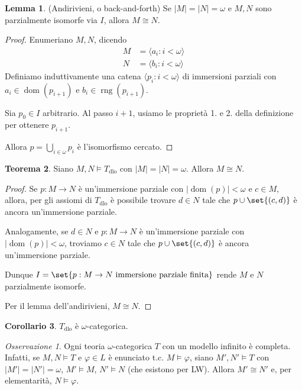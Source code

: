 \documentclass[10pt]{article}
\newcommand{\card}[1]{\left\vert #1 \right\vert}
\newcommand{\1}{\mathds{1}}
\theoremstyle{definition}%
\newtheorem{thm}{Teorema}[section]
\newtheorem{lem}[thm]{Lemma}
\newtheorem{cor}[thm]{Corollario}
\theoremstyle{plain}
\theoremstyle{remark}
\newtheorem*{oss}{Osservazione}
\newcommand{\Tdlo}{T_{\text{dlo}}}
\begin{document}
\begin{lem}
(Andirivieni, o back-and-forth) Se \(\card{M}=\card{N}=\omega\) e \(M,N\) sono parzialmente isomorfe via \(I\), allora \(M\cong N\).
\end{lem}
\begin{proof}
Enumeriano \(M,N\), dicendo
\begin{align*}
M&=\langle a_{i}: i <\omega\rangle\\
N&=\langle b_{i}: i <\omega\rangle
\end{align*}
Definiamo induttivamente una catena \(\langle p_{i}:i<\omega\rangle\) di immersioni parziali con \(a_{i} \in \operatorname{dom}(p_{i+1})\) e \(b_{i} \in \operatorname{rng}(p_{i+1})\).

Sia \(p_{0} \in I\) arbitrario. Al passo \(i+1\), usiamo le proprietà 1. e 2. della definizione per ottenere \(p_{i+1}\).

Allora \(p=\bigcup_{i \in \omega}p_{i}\) è l'isomorfismo cercato.
\end{proof}

\begin{thm}
Siano \(M,N\vDash \Tdlo\) con \(\card{M}=\card{N}=\omega\). Allora \(M\cong N\).
\end{thm}

\begin{proof}
Se \(p:M\to N\) è un'immersione parziale con \(\card{\operatorname{dom}(p)}<\omega\) e \(c \in M\), allora, per gli assiomi di \(\Tdlo\) è possibile trovare \(d \in N\) tale che \(p\cup\set{(c,d)}\) è ancora un'immersione parziale.

Analogamente, se \(d \in N\) e \(p:M\to N\) è un'immersione parziale con \(\card{\operatorname{dom}(p)}<\omega\), troviamo \(c \in N\) tale che \(p\cup\set{(c,d)}\) è ancora un'immersione parziale.

Dunque \(I=\set{p:M\to N\text{ immersione parziale finita}}\) rende \(M\) e \(N\) parzialmente isomorfe.

Per il lemma dell'andirivieni, \(M\cong N\).
\end{proof}

\begin{cor}
\(\Tdlo\) è \(\omega\)-categorica.
\end{cor}

\begin{oss}
Ogni teoria \(\omega\)-categorica \(T\) con un modello infinito è completa. Infatti, se \(M,N\vDash T\) e \(\varphi \in L\) è enunciato t.c. \(M\vDash\varphi\), siano \(M',N'\vDash T\) con \(\card{M'}=\card{N'}=\omega\), \(M'\vDash M\), \(N'\vDash N\) (che esistono per LW). Allora \(M'\cong N'\) e, per elementarità, \(N\vDash\varphi\).
\end{oss}
\end{document}
